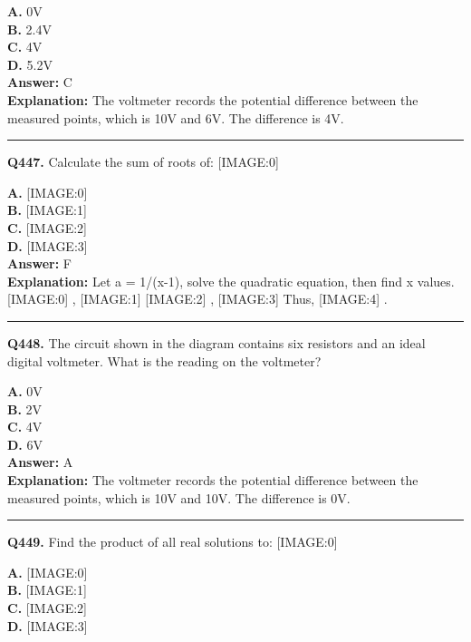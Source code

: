 \documentclass[12pt]{article}
\begin{document}
\textbf{A.} 0V \\
\textbf{B.} 2.4V \\
\textbf{C.} 4V \\
\textbf{D.} 5.2V \\

\textbf{Answer:} C \\
\textbf{Explanation:} The voltmeter records the potential difference between the measured points, which is 10V and 6V. The difference is 4V.

\hrule
\vspace{1em}


\noindent
\textbf{Q447.} Calculate the sum of roots of:
[IMAGE:0]



\textbf{A.} [IMAGE:0] \\
\textbf{B.} [IMAGE:1] \\
\textbf{C.} [IMAGE:2] \\
\textbf{D.} [IMAGE:3] \\

\textbf{Answer:} F \\
\textbf{Explanation:} Let a = 1/(x-1), solve the quadratic equation, then find x values.
[IMAGE:0]
,
[IMAGE:1]
[IMAGE:2]
,
[IMAGE:3]
Thus,
[IMAGE:4]
.

\hrule
\vspace{1em}


\noindent
\textbf{Q448.} The circuit shown in the diagram contains six resistors and an ideal digital voltmeter.
What is the reading on the voltmeter?



\textbf{A.} 0V \\
\textbf{B.} 2V \\
\textbf{C.} 4V \\
\textbf{D.} 6V \\

\textbf{Answer:} A \\
\textbf{Explanation:} The voltmeter records the potential difference between the measured points, which is 10V and 10V. The difference is 0V.

\hrule
\vspace{1em}


\noindent
\textbf{Q449.} Find the product of all real solutions to:
[IMAGE:0]



\textbf{A.} [IMAGE:0] \\
\textbf{B.} [IMAGE:1] \\
\textbf{C.} [IMAGE:2] \\
\textbf{D.} [IMAGE:3] \\
\end{document}

